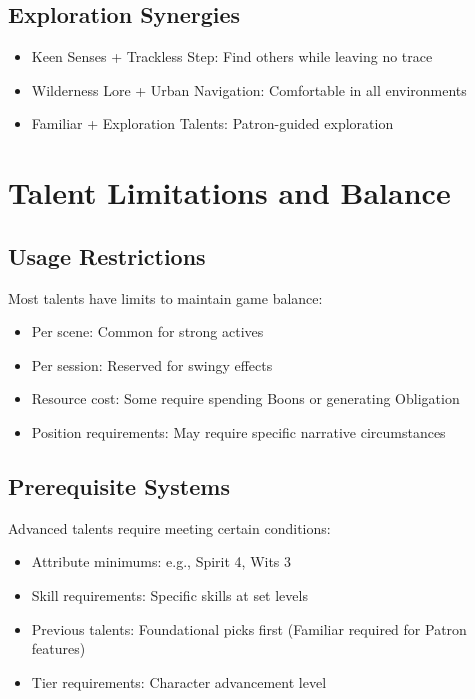 \documentclass[11pt,twoside,openany]{book}
\begin{document}
\subsection*{Exploration Synergies}

\begin{itemize}
\item Keen Senses + Trackless Step: Find others while leaving no trace
\item Wilderness Lore + Urban Navigation: Comfortable in all environments
\item Familiar + Exploration Talents: Patron-guided exploration
\end{itemize}

\section*{Talent Limitations and Balance} 

\subsection*{Usage Restrictions}

Most talents have limits to maintain game balance:
\begin{itemize}
\item Per scene: Common for strong actives
\item Per session: Reserved for swingy effects
\item Resource cost: Some require spending Boons or generating Obligation
\item Position requirements: May require specific narrative circumstances
\end{itemize}

\subsection*{Prerequisite Systems}

Advanced talents require meeting certain conditions:
\begin{itemize}
\item Attribute minimums: e.g., Spirit 4, Wits 3
\item Skill requirements: Specific skills at set levels
\item Previous talents: Foundational picks first (Familiar required for Patron features)
\item Tier requirements: Character advancement level
\end{itemize}
\end{document}
